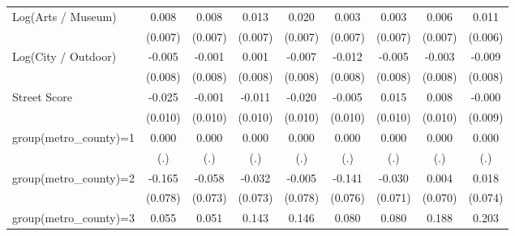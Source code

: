 {\begin{tabular}{l*{8}{c}}
Log(Arts / Museum)  &       0.008         &       0.008         &       0.013\sym{*}  &       0.020\sym{***}&       0.003         &       0.003         &       0.006         &       0.011\sym{*}  \\
                    &     (0.007)         &     (0.007)         &     (0.007)         &     (0.007)         &     (0.007)         &     (0.007)         &     (0.007)         &     (0.006)         \\
Log(City / Outdoor) &      -0.005         &      -0.001         &       0.001         &      -0.007         &      -0.012         &      -0.005         &      -0.003         &      -0.009         \\
                    &     (0.008)         &     (0.008)         &     (0.008)         &     (0.008)         &     (0.008)         &     (0.008)         &     (0.008)         &     (0.008)         \\
Street Score        &      -0.025\sym{**} &      -0.001         &      -0.011         &      -0.020\sym{**} &      -0.005         &       0.015         &       0.008         &      -0.000         \\
                    &     (0.010)         &     (0.010)         &     (0.010)         &     (0.010)         &     (0.010)         &     (0.010)         &     (0.010)         &     (0.009)         \\
group(metro\_county)=1&       0.000         &       0.000         &       0.000         &       0.000         &       0.000         &       0.000         &       0.000         &       0.000         \\
                    &         (.)         &         (.)         &         (.)         &         (.)         &         (.)         &         (.)         &         (.)         &         (.)         \\
group(metro\_county)=2&      -0.165\sym{**} &      -0.058         &      -0.032         &      -0.005         &      -0.141\sym{*}  &      -0.030         &       0.004         &       0.018         \\
                    &     (0.078)         &     (0.073)         &     (0.073)         &     (0.078)         &     (0.076)         &     (0.071)         &     (0.070)         &     (0.074)         \\
group(metro\_county)=3&       0.055         &       0.051         &       0.143         &       0.146         &       0.080         &       0.080         &       0.188\sym{*}  &       0.203\sym{**} \\

\end{tabular}}
